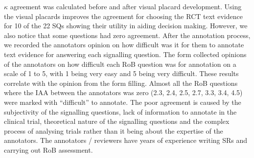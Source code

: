 \documentclass[sn-mathphys,Numbered]{sn-jnl}%
\theoremstyle{thmstyleone}%
\theoremstyle{thmstyletwo}%
\theoremstyle{thmstylethree}%
\begin{document}
%
$\kappa$ agreement was calculated before and after visual placard development.
Using the visual placards improves the agreement for choosing the RCT text evidence for 10 of the 22 SQs showing their utility in aiding decision making.
However, we also notice that some questions had zero agreement.
After the annotation process, we recorded the annotators opinion on how difficult was it for them to annotate text evidence for answering each signalling question.
The form collected opinions of the annotators on how difficult each RoB question was for annotation on a scale of 1 to 5, with 1 being very easy and 5 being very difficult.
These results correlate with the opinion from the form filling.
Almost all the RoB questions where the IAA between the annotators was zero (2.3, 2.4, 2.5, 2.7, 3.3, 3.4, 4.5) were marked with ``difficult'' to annotate.
The poor agreement is caused by the subjectivity of the signalling questions, lack of information to annotate in the clinical trial, theoretical nature of the signalling questions and the complex process of analysing trials rather than it being about the expertise of the annotators.
The annotators / reviewers have years of experience writing SRs and carrying out RoB assessment.
\end{document}
